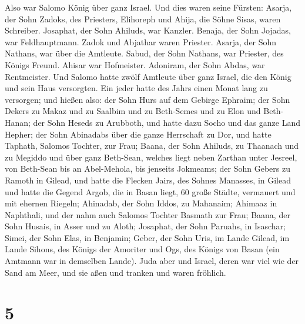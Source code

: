  Also war Salomo König über ganz Israel. 
Und dies waren seine Fürsten: Asarja, der Sohn Zadoks, des Priesters,
 Elihoreph und Ahija, die Söhne Sisas, waren Schreiber.
Josaphat, der Sohn Ahiluds, war Kanzler.  Benaja, der Sohn
Jojadas, war Feldhauptmann. Zadok und Abjathar waren Priester.
 Asarja, der Sohn Nathans, war über die Amtleute. Sabud,
der Sohn Nathans, war Priester, des Königs Freund.  Ahisar
war Hofmeister. Adoniram, der Sohn Abdas, war Rentmeister.
 Und Salomo hatte zwölf Amtleute über ganz Israel, die den
König und sein Haus versorgten. Ein jeder hatte des Jahrs einen Monat
lang zu versorgen;  und hießen also: der Sohn Hurs auf dem
Gebirge Ephraim;  der Sohn Dekers zu Makaz und zu Saalbim
und zu Beth-Semes und zu Elon und Beth-Hanan;  der Sohn
Heseds zu Arubboth, und hatte dazu Socho und das ganze Land Hepher;
 der Sohn Abinadabs über die ganze Herrschaft zu Dor, und
hatte Taphath, Salomos Tochter, zur Frau;  Baana, der
Sohn Ahiluds, zu Thaanach und zu Megiddo und über ganz Beth-Sean,
welches liegt neben Zarthan unter Jesreel, von Beth-Sean bis an
Abel-Mehola, bis jenseits Jokmeams;  der Sohn Gebers zu
Ramoth in Gilead, und hatte die Flecken Jairs, des Sohnes Manasses, in
Gilead und hatte die Gegend Argob, die in Basan liegt, 60 große Städte,
vermauert und mit ehernen Riegeln;  Ahinadab, der Sohn
Iddos, zu Mahanaim;  Ahimaaz in Naphthali, und der nahm
auch Salomos Tochter Basmath zur Frau;  Baana, der Sohn
Husais, in Asser und zu Aloth;  Josaphat, der Sohn
Paruahs, in Isaschar;  Simei, der Sohn Elas, in Benjamin;
 Geber, der Sohn Uris, im Lande Gilead, im Lande Sihons,
des Königs der Amoriter und Ogs, des Königs von Basan (ein Amtmann war
in demselben Lande).  Juda aber und Israel, deren war
viel wie der Sand am Meer, und sie aßen und tranken und waren fröhlich.

\hypertarget{section-4}{%
\section{5}\label{section-4}}

